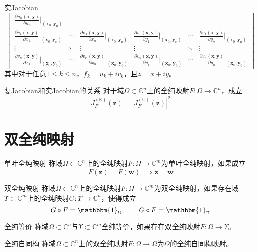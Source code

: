 \documentclass[lang = cn, scheme = chinese, thmcnt = section]{elegantbook}
\newcommand{\R}{\mathbb{R}}            %
\newcommand{\C}{\mathbb{C}}  		   %
\newcommand{\sub}{\subset}             %
\newcommand{\bs}{\boldsymbol}          %
\begin{document}
\begin{definition}{实Jacobian}
$$\begin{vmatrix}
		\frac{\partial u_n(\bs{x},\bs{y})}{\partial y_n}|_{(\bs{x}_0,\bs{y}_0)}\\
		\frac{\partial v_1(\bs{x},\bs{y})}{\partial x_1}|_{(\bs{x}_0,\bs{y}_0)}
		& \cdots &
		\frac{\partial v_1(\bs{x},\bs{y})}{\partial x_n}|_{(\bs{x}_0,\bs{y}_0)}
		&
		\frac{\partial v_1(\bs{x},\bs{y})}{\partial y_1}|_{(\bs{x}_0,\bs{y}_0)}
		& \cdots &
		\frac{\partial v_1(\bs{x},\bs{y})}{\partial y_n}|_{(\bs{x}_0,\bs{y}_0)}\\
		\vdots & \ddots & \vdots & \vdots & \ddots & \vdots\\
		\frac{\partial v_n(\bs{x},\bs{y})}{\partial x_1}|_{(\bs{x}_0,\bs{y}_0)}
		& \cdots &
		\frac{\partial v_n(\bs{x},\bs{y})}{\partial x_n}|_{(\bs{x}_0,\bs{y}_0)}
		&
		\frac{\partial v_n(\bs{x},\bs{y})}{\partial y_1}|_{(\bs{x}_0,\bs{y}_0)}
		& \cdots &
		\frac{\partial v_n(\bs{x},\bs{y})}{\partial y_n}|_{(\bs{x}_0,\bs{y}_0)}
	\end{vmatrix}
	$$
	其中对于任意$1\le k\le n$，$f_k=u_k+iv_k$，且$z=x+iy$。
\end{definition}

\begin{theorem}{复Jacobian和实Jacobian的关系}
	对于域$\Omega\sub\C^n$上的全纯映射$F:\Omega\to\C^n$，成立%
	$$
	J_F^{(\R)}(\bs{z})
	=|J_F^{(\C)}(\bs{z})|^2
	$$
\end{theorem}

\section{双全纯映射}

\begin{definition}{单叶全纯映射}
	称域$\Omega\sub \C^{n}$上的全纯映射$F:\Omega\to\C^m$为单叶全纯映射，如果成立
	$$
	F(\bs{z})=F(\bs{w})\implies
	\bs{z}=\bs{w}
	$$
\end{definition}

\begin{definition}{双全纯映射}
	称域$\Omega\sub \C^{n}$上的全纯映射$F:\Omega\to\C^m$为双全纯映射，如果存在域$\Upsilon\sub\C^m$上的全纯映射$G:\Upsilon\to\C^n$，使得成立
	$$
	G\circ F=\mathbbm{1}_{\Omega},\qquad 
	G\circ F=\mathbbm{1}_{\Upsilon}
	$$
\end{definition}

\begin{definition}{全纯等价}
	称域$\Omega\sub \C^{n}$与$\Upsilon\sub\C^m$全纯等价，如果存在双全纯映射$F:\Omega\to\Upsilon$。
\end{definition}

\begin{definition}{全纯自同构}
	称域$\Omega\sub \C^{n}$上的双全纯映射$F:\Omega\to\Omega$为$\Omega$的全纯自同构映射。
\end{definition}
\end{document}

